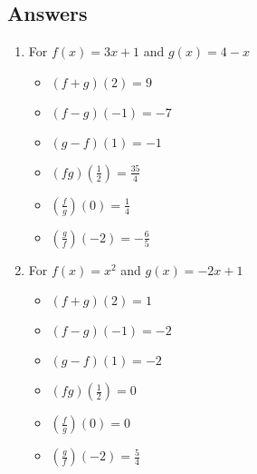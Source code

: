 \newpage

\subsection{Answers}

\begin{enumerate}

\item For  $f(x) = 3x+1$ and $g(x) = 4-x$

\begin{multicols}{3}
\begin{itemize}

\item  $(f+g)(2) = 9$
\item  $(f-g)(-1) = -7$
\item  $(g-f)(1) = -1$

\end{itemize}
\end{multicols}

\begin{multicols}{3}
\begin{itemize}

\item  $(fg)\left(\frac{1}{2}\right) = \frac{35}{4}$
\item  $\left(\frac{f}{g}\right)(0) = \frac{1}{4}$
\item  $\left(\frac{g}{f}\right)\left(-2\right) = -\frac{6}{5}$

\end{itemize}
\end{multicols}

\item For  $f(x) = x^2$ and $g(x) = -2x+1$

\begin{multicols}{3}
\begin{itemize}

\item  $(f+g)(2) = 1$
\item  $(f-g)(-1) = -2$
\item  $(g-f)(1) = -2$

\end{itemize}
\end{multicols}

\begin{multicols}{3}
\begin{itemize}

\item  $(fg)\left(\frac{1}{2}\right) = 0$
\item  $\left(\frac{f}{g}\right)(0) = 0$
\item  $\left(\frac{g}{f}\right)\left(-2\right) = \frac{5}{4}$


\end{itemize}
\end{multicols}
\end{enumerate}
